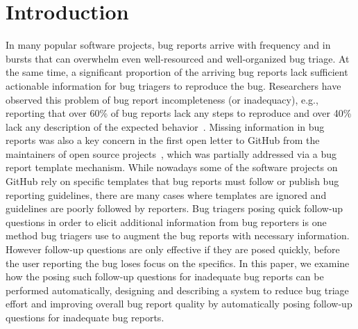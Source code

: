 \section{Introduction}

In many popular software projects, bug reports arrive with frequency and in bursts that can overwhelm even well-resourced and well-organized bug triage.
%
At the same time, a significant proportion of the arriving bug reports lack sufficient actionable information for bug triagers to reproduce the bug.
%
Researchers have observed this problem of bug report incompleteness (or inadequacy), e.g., reporting that over 60\% of bug reports lack any steps to reproduce and over 40\% lack any description of the expected behavior~\cite{chaparro17detecting}.
%
Missing information in bug reports was also a key concern in the first open letter to GitHub from the maintainers of open source projects~\cite{deargithub}, which was partially addressed via a bug report template mechanism.
%
While nowadays some of the software projects on GitHub rely on specific templates that bug reports must follow or publish bug reporting guidelines, there are many cases where templates are ignored and guidelines are poorly followed by reporters.
%
Bug triagers posing quick follow-up questions in order to elicit additional information from bug reporters is one method bug triagers use to augment the bug reports with necessary information.
%
However follow-up questions are only effective if they are posed quickly, before the user reporting the bug loses focus on the specifics.
%
In this paper, we examine how the posing such follow-up questions for inadequate bug reports can be performed automatically, designing and describing a system to reduce bug triage effort and improving overall bug report quality by automatically posing follow-up questions for inadequate bug reports.


